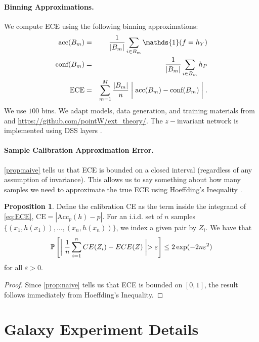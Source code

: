 \documentclass[10pt]{article} %
\theoremstyle{definition}
\newtheorem{proposition}{Proposition}
\newcommand{\Acc}{\mathrm{Acc}_p(h)}
\begin{document}
\paragraph{Binning Approximations.} We compute ECE using the following binning approximations:
%
\begin{eqnarray}
    \text{acc}(B_m) &=& \frac{1}{|B_m|}\sum_{i \in B_m}\mathds{1}(f = h_Y) \label{eq:acc}\\ 
    \text{conf}(B_m) &=& \frac{1}{|B_m|} \sum_{i \in B_m} h_P\\
    \text{ECE} &=& \sum_{m=1}^M\frac{|B_m|}{n} \biggm| \text{acc}(B_m) - \text{conf}(B_m) \biggm|. \label{eq:approx}
\end{eqnarray}
%
We use $100$ bins. We adapt models, data generation, and training materials from \cite{wang2024general} and \url{https://github.com/pointW/ext_theory/}. The $z-$invariant network is implemented using DSS layers \citep{maron2020learning}. 

\paragraph{Sample Calibration Approximation Error.} \label{sec:corollary_bins}

\cref{prop:naive} tells us that ECE is bounded on a closed interval (regardless of any assumption of invariance). This allows us to say something about how many samples we need to approximate the true ECE using Hoeffding's Inequality \citep{hoeffding1963probability, hoeffding1994probability}. 

\begin{proposition}
Define the calibration CE as the term inside the integrand of  \cref{eq:ECE}, $\text{CE} = |\Acc - p|$. For an i.i.d. set of $n$ samples $\{(x_1, h(x_1)), \hdots, (x_n, h(x_n))\}$, we index a given pair by $Z_i$. We have that
\begin{equation*}
    \mathbb{P}\left[\biggm| \frac{1}{n}\sum_{i=1}^n CE(Z_i) - ECE(Z) \biggm| > \varepsilon \right] \leq 2 \exp (-2n \varepsilon^2)
\end{equation*}
for all $\varepsilon > 0$.
\end{proposition}

\begin{proof}
Since \cref{prop:naive} tells us that ECE is bounded on $[0,1]$, the result follows immediately from Hoeffding's Inequality.   
\end{proof}

\section{Galaxy Experiment Details} \label{sec:gal_experiment}
\end{document}
